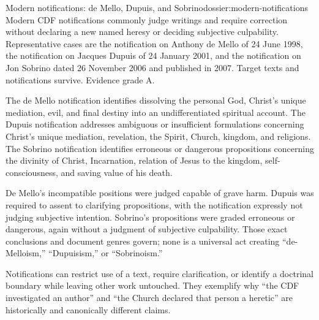 \begin{heresydossier}{Modern notifications: de Mello, Dupuis, and Sobrino}{dossier:modern-notifications}
\objectfield Modern CDF notifications commonly judge writings and require correction without declaring a new named heresy or deciding subjective culpability. Representative cases are the notification on Anthony de Mello of 24 June 1998, the notification on Jacques Dupuis of 24 January 2001, and the notification on Jon Sobrino dated 26 November 2006 and published in 2007. Target texts and notifications survive. Evidence grade A.

\propositionfield The de Mello notification identifies dissolving the personal God, Christ's unique mediation, evil, and final destiny into an undifferentiated spiritual account. The Dupuis notification addresses ambiguous or insufficient formulations concerning Christ's unique mediation, revelation, the Spirit, Church, kingdom, and religions. The Sobrino notification identifies erroneous or dangerous propositions concerning the divinity of Christ, Incarnation, relation of Jesus to the kingdom, self-consciousness, and saving value of his death.

\responsefield De Mello's incompatible positions were judged capable of grave harm. Dupuis was required to assent to clarifying propositions, with the notification expressly not judging subjective intention. Sobrino's propositions were graded erroneous or dangerous, again without a judgment of subjective culpability. Those exact conclusions and document genres govern; none is a universal act creating ``de-Melloism,'' ``Dupuisism,'' or ``Sobrinoism.''

\aftermathfield Notifications can restrict use of a text, require clarification, or identify a doctrinal boundary while leaving other work untouched. They exemplify why ``the CDF investigated an author'' and ``the Church declared that person a heretic'' are historically and canonically different claims.
\end{heresydossier}


